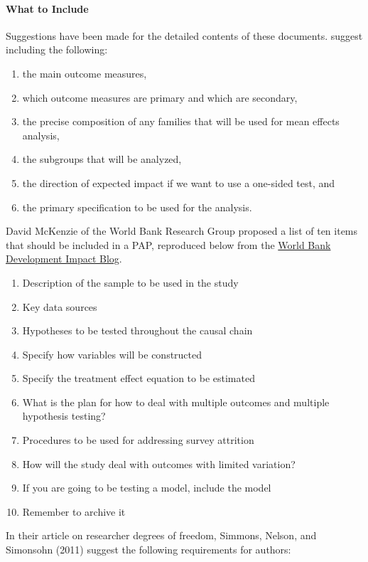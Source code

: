 \documentclass[12pt] {article}
\begin{document}
\paragraph{What to Include}
Suggestions have been made for the detailed contents of these documents.
\cite{glennerster_running_2013} suggest including the following:

\begin{enumerate}
\def\labelenumi{\arabic{enumi}.}
\item
  the main outcome measures,
\item
  which outcome measures are primary and which are secondary,
\item
  the precise composition of any families that will be used for mean
  effects analysis,
\item
  the subgroups that will be analyzed,
\item
  the direction of expected impact if we want to use a one-sided test,
  and
\item
  the primary specification to be used for the analysis.
\end{enumerate}
David McKenzie of the World Bank Research Group proposed a list of ten
items that should be included in a PAP, reproduced below from the \href{http://blogs.worldbank.org/impactevaluations/a-pre-analysis-plan-checklist}{World Bank Development Impact Blog}.

\begin{enumerate}
\item
  Description of the sample to be used in the study
\item
  Key data sources
\item
  Hypotheses to be tested throughout the causal chain
\item
  Specify how variables will be constructed
\item
  Specify the treatment effect equation to be estimated
\item
  What is the plan for how to deal with multiple outcomes and multiple
  hypothesis testing?
\item
  Procedures to be used for addressing survey attrition
\item
  How will the study deal with outcomes with limited variation?
\item
  If you are going to be testing a model, include the model
\item
  Remember to archive it
\end{enumerate}

In their article on researcher degrees of freedom, Simmons, Nelson, and
Simonsohn (2011) suggest the following requirements for authors:
\end{document}
